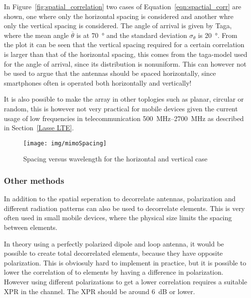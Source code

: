 In Figure~\ref{fig:spatial_correlation} two cases of Equation~\ref{eqn:spactial_corr} are shown, one where only the horizontal spacing is considered and another whre only the vertical spacing is considered. The angle of arrival is given by Taga, where the mean angle $\overline{\theta}$ is at \SI{70}{\degree} and the standard deviation $\sigma_\theta$ is \SI{20}{\degree}. From the plot it can be seen that the vertical spacing required for a certain correlation is larger than that of the horizontal spacing, this comes from the taga-model used for the angle of arrival, since its distribution is nonuniform. This can however not be used to argue that the antennas should be spaced horizontally, since smartphones often is operated both horizontally and vertically! 

It is also possible to make the array in other toplogies such as planar, circular or random, this is however not very practical for mobile devices given the current usage of low frequencies in telecommunication \SIrange{500}{2700}{MHz} as described in Section~\ref{Lasse LTE}.

\begin{figure}[htbp]
  \centering
  \texttt{[image: img/mimoSpacing]}
  \caption{Spacing versus wavelength for the horizontal and vertical case\cite{Tim2012Practical}}
  \label{fig:mimo-spacing}
\end{figure}

\subsubsection{Other methods} %
In addition to the spatial seperation to decorrelate antennas, polarization and different radiation patterns can also be used to decorrelate elements. This is very often used in small mobile devices, where the physical size limits the spacing between elements.  

In theory using a perfectly polarized dipole and loop antenna, it would be possible to create total decorrelated elements, because they have opposite polarization. This is obviosuly hard to implement in practice, but it is possible to lower the correlation of to elements by having a difference in polarization. However using different polarizations to get a lower correlation requires a suitable XPR in the channel. The XPR should be around \SI{6}{dB} or lower\cite{Tim2012Practical}. 






 




